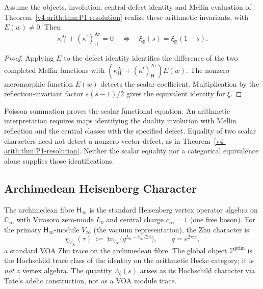 \begin{theorem}
\label{v4-arith:w5-direct:thm:P1-elementary}
Assume the objects, involution, central-defect identity and
Mellin evaluation of Theorem~\ref{v4-arith:thm:P1-resolution}
realize these arithmetic invariants, with \(E(w)\ne0\).
Then
\[
 \kappa^{\mathrm{Ar}}_{\mathsf H}
       +(\kappa^!)^{\mathrm{Ar}}_{\mathsf H}=0
 \quad\Longleftrightarrow\quad
 \xi_{\mathbb R}(s)=\xi_{\mathbb R}(1-s).
\]
\end{theorem}
\begin{proof}
Applying \(E\) to the defect identity identifies the difference
of the two completed Mellin functions with
\((\kappa^{\mathrm{Ar}}_{\mathsf H}
 +(\kappa^!)^{\mathrm{Ar}}_{\mathsf H})E(w)\).
The nonzero meromorphic function \(E(w)\) detects the scalar
coefficient. Multiplication by the reflection-invariant
factor \(s(s-1)/2\) gives the equivalent identity for \(\xi\).
\end{proof}

\begin{remark}
\label{v4-arith:w5-direct:rem:P1-elementary}
Poisson summation proves the scalar functional equation.
An arithmetic interpretation requires maps identifying the
duality involution with Mellin reflection and the central
classes with the specified defect.
Equality of two scalar characters need not detect a nonzero
vector defect, as in Theorem~\ref{v4-arith:thm:P1-resolution}.
Neither the scalar equality nor a categorical equivalence
alone supplies those identifications.
\end{remark}

\subsection{Archimedean Heisenberg Character}
\label{v4-arith:w5-direct:step-2}

\begin{definition}
\label{v4-arith:w5-direct:def:zhu}
The archimedean fibre \(\mathsf{H}_{\infty}\) is the standard Heisenberg
vertex operator algebra on \(\mathbb{C}_{\infty}\) with Virasoro zero-mode
\(L_{0}\) and central charge \(c_{\infty}=1\) (one free boson). For the
primary \(\mathsf{H}_{\infty}\)-module \(V_{\infty}\) (the vacuum
representation), the Zhu character is
\begin{equation}
\label{v4-arith:w5-direct:eq:zhu-char}
\chi_{V_{\infty}}(\tau)\;:=\;\mathrm{tr}_{V_{\infty}}\bigl(q^{L_{0}-c_{\infty}/24}\bigr),
\qquad q=e^{2\pi i\tau},
\end{equation}
a standard VOA Zhu trace on the archimedean fibre. The global object
\(\mathcal{V}^{\mathrm{prim}}\) is the Hochschild trace class of the
identity on the arithmetic Hecke category; it is \emph{not} a vertex
algebra. The quantity \(\Lambda_{\zeta}(s)\) arises as its Hochschild
character via Tate's adelic construction, not as a VOA module trace.
\end{definition}

